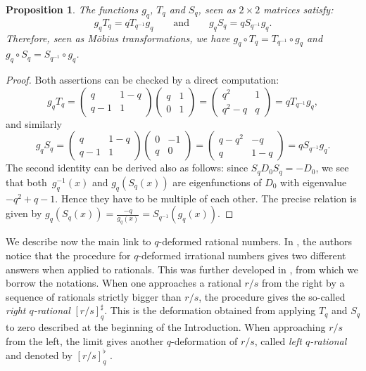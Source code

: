 \documentclass[10pt,a4paper]{amsart}
\numberwithin{equation}{section}
\newtheorem{Proposition}[Theorem]{Proposition}
 { \theoremstyle{definition}
\newtheorem{Definition}[Theorem]{Definition}
\newtheorem{Note}[Theorem]{Note}
\newtheorem{Example}[Theorem]{Example}
\newtheorem{Remark}[Theorem]{Remark} }
\begin{document}
\begin{Proposition}\label{Prop:qg-Tq-Sq}
The functions $g_q$, $T_q$ and $S_q$, seen as $2\times 2$ matrices satisfy:
\[
g_qT_q=qT_{q^{-1}}g_q \qquad \text{and}\qquad g_qS_q=qS_{q^{-1}}g_q.
\]
Therefore, seen as M\"obius transformations, we have $g_q\circ T_q = T_{q^{-1}}\circ g_q$ and $g_q\circ S_q = S_{q^{-1}}\circ g_q$.
\end{Proposition}
\begin{proof}
Both assertions can be checked by a direct computation:
\[
g_qT_q=\begin{pmatrix}q & 1-q\\q-1 & 1 \end{pmatrix}\begin{pmatrix}q & 1\\0 & 1 \end{pmatrix}=\begin{pmatrix}q^2 & 1\\q^2-q & q \end{pmatrix}=qT_{q^{-1}}g_q,
\]
and similarly
\[
g_qS_q=\begin{pmatrix}q & 1-q\\q-1 & 1 \end{pmatrix}\begin{pmatrix}0 & -1\\q & 0 \end{pmatrix}=\begin{pmatrix}q-q^2 & -q\\q & 1-q \end{pmatrix}=qS_{q^{-1}}g_q.
\]
The second identity can be derived also as follows: since $S_qD_0S_q=-D_0$, we see that both~$g_q^{-1}(x)$ and $g_q(S_q(x))$ are eigenfunctions of $D_0$ with eigenvalue $-q^2+q-1$. Hence they have to be multiple of each other. The precise relation is given by $g_q(S_q(x))=\tfrac{-q}{g_q(x)}=S_{q^{-1}}(g_q(x))$.
\end{proof}

We describe now the main link to $q$-deformed rational numbers. In \cite[Remark 3.2]{morier2022q}, the authors notice that the procedure for $q$-deformed irrational numbers gives two different answers when applied to rationals. This was further developed in \cite{bapat2023q}, from which we borrow the notations. When one approaches a rational $r/s$ from the right by a sequence of rationals strictly bigger than $r/s$, the procedure gives the so-called \emph{right $q$-rational} $[r/s]_q^\sharp$. This is the deformation obtained from applying $T_q$ and $S_q$ to zero described at the beginning of the Introduction. When approaching $r/s$ from the left, the limit gives another $q$-deformation of $r/s$, called \emph{left $q$-rational} and denoted by $[r/s]_q^\flat$ \cite[Theorem~2.11]{bapat2023q}.
\end{document}

